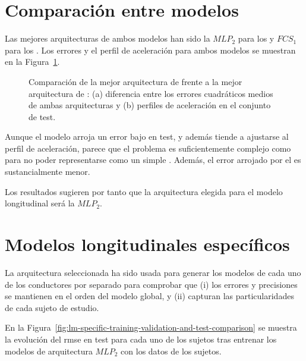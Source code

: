 \section{Comparación entre modelos}

Las mejores arquitecturas de ambos modelos han sido la $MLP_2$ para los  y $FCS_1$ para los . Los errores y el perfil de aceleración para ambos modelos se muestran en la Figura~\ref{fig:cf-comparison-between-best-mlp-and-fcs-architecture}.

\begin{figure}
	\centering
	\qquad
	\caption[Comparación entre los dos tipos de modelo longitudinal]{Comparación de la mejor arquitectura de  frente a la mejor arquitectura de : (a) diferencia entre los errores cuadráticos medios de ambas arquitecturas y (b) perfiles de aceleración en el conjunto de test.}
	\label{fig:cf-comparison-between-best-mlp-and-fcs-architecture}
\end{figure}

Aunque el modelo arroja un error bajo en test, y además tiende a ajustarse al perfil de aceleración, parece que el problema es suficientemente complejo como para no poder representarse como un simple . Además, el error arrojado por el  es sustancialmente menor.

Los resultados sugieren por tanto que la arquitectura elegida para el modelo longitudinal será la $MLP_2$.

\section{Modelos longitudinales específicos}

La arquitectura seleccionada ha sido usada para generar los modelos de cada uno de los conductores por separado para comprobar que (i) los errores y precisiones se mantienen en el orden del modelo global, y (ii) capturan las particularidades de cada sujeto de estudio.

En la Figura~\ref{fig:lm-specific-training-validation-and-test-comparison} se muestra la evolución del \gls{rmse} en test para cada uno de los sujetos tras entrenar los modelos de arquitectura $MLP_2$ con los datos de los sujetos.

